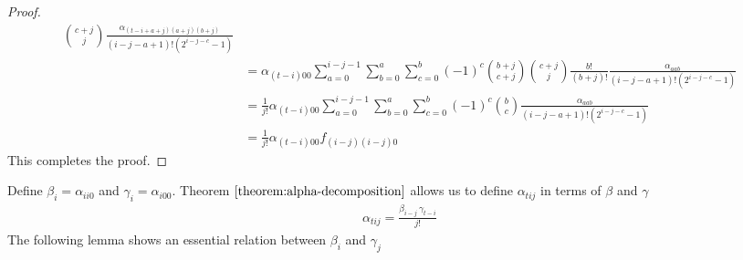 \documentclass{article}
\begin{document}
\begin{proof}
\begin{align*}
        \binom{c+j}{j}
        \frac{\alpha_{(t-i+a+j)(a+j)(b+j)}}
             {(i-j-a+1)!(2^{i-j-c}-1)} \\
&= 
  \alpha_{(t-i)00}
  \sum_{a=0}^{i-j-1}
    \sum_{b=0}^{a}
      \sum_{c=0}^{b}
        (-1)^{c}
        \binom{b+j}{c+j}
        \binom{c+j}{j}
        \frac{b!}{(b+j)!}
        \frac{\alpha_{aab}}
             {(i-j-a+1)!(2^{i-j-c}-1)} \\
&= 
  \frac{1}{j!}
  \alpha_{(t-i)00}
  \sum_{a=0}^{i-j-1}
    \sum_{b=0}^{a}
      \sum_{c=0}^{b}
        (-1)^{c}
        \binom{b}{c}
        \frac{\alpha_{aab}}
             {(i-j-a+1)!(2^{i-j-c}-1)} \\
&= 
  \frac{1}{j!}
  \alpha_{(t-i)00}
  f_{(i-j)(i-j)0}
\end{align*}
This completes the proof.
\end{proof}

Define $\beta_i = \alpha_{ii0}$ and $\gamma_i = \alpha_{i00}$. Theorem $\ref{theorem:alpha-decomposition}$ allows us to define $\alpha_{tij}$ in terms of $\beta$ and $\gamma$
\begin{align}
\label{eq:beta-gamma-decomposition}
\alpha_{tij} = \frac{\beta_{i-j} \, \gamma_{t-i}}{j!} 
\end{align}
The following lemma shows an essential relation between $\beta_i$ and $\gamma_j$
\end{document}
